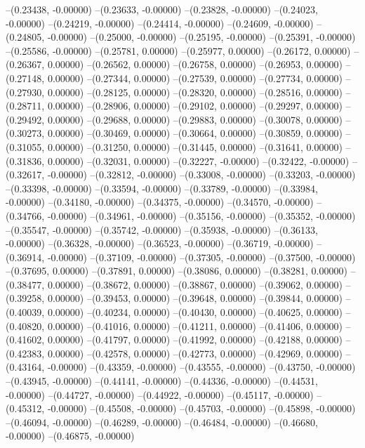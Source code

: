 --(0.23438, -0.00000)
--(0.23633, -0.00000)
--(0.23828, -0.00000)
--(0.24023, -0.00000)
--(0.24219, -0.00000)
--(0.24414, -0.00000)
--(0.24609, -0.00000)
--(0.24805, -0.00000)
--(0.25000, -0.00000)
--(0.25195, -0.00000)
--(0.25391, -0.00000)
--(0.25586, -0.00000)
--(0.25781, 0.00000)
--(0.25977, 0.00000)
--(0.26172, 0.00000)
--(0.26367, 0.00000)
--(0.26562, 0.00000)
--(0.26758, 0.00000)
--(0.26953, 0.00000)
--(0.27148, 0.00000)
--(0.27344, 0.00000)
--(0.27539, 0.00000)
--(0.27734, 0.00000)
--(0.27930, 0.00000)
--(0.28125, 0.00000)
--(0.28320, 0.00000)
--(0.28516, 0.00000)
--(0.28711, 0.00000)
--(0.28906, 0.00000)
--(0.29102, 0.00000)
--(0.29297, 0.00000)
--(0.29492, 0.00000)
--(0.29688, 0.00000)
--(0.29883, 0.00000)
--(0.30078, 0.00000)
--(0.30273, 0.00000)
--(0.30469, 0.00000)
--(0.30664, 0.00000)
--(0.30859, 0.00000)
--(0.31055, 0.00000)
--(0.31250, 0.00000)
--(0.31445, 0.00000)
--(0.31641, 0.00000)
--(0.31836, 0.00000)
--(0.32031, 0.00000)
--(0.32227, -0.00000)
--(0.32422, -0.00000)
--(0.32617, -0.00000)
--(0.32812, -0.00000)
--(0.33008, -0.00000)
--(0.33203, -0.00000)
--(0.33398, -0.00000)
--(0.33594, -0.00000)
--(0.33789, -0.00000)
--(0.33984, -0.00000)
--(0.34180, -0.00000)
--(0.34375, -0.00000)
--(0.34570, -0.00000)
--(0.34766, -0.00000)
--(0.34961, -0.00000)
--(0.35156, -0.00000)
--(0.35352, -0.00000)
--(0.35547, -0.00000)
--(0.35742, -0.00000)
--(0.35938, -0.00000)
--(0.36133, -0.00000)
--(0.36328, -0.00000)
--(0.36523, -0.00000)
--(0.36719, -0.00000)
--(0.36914, -0.00000)
--(0.37109, -0.00000)
--(0.37305, -0.00000)
--(0.37500, -0.00000)
--(0.37695, 0.00000)
--(0.37891, 0.00000)
--(0.38086, 0.00000)
--(0.38281, 0.00000)
--(0.38477, 0.00000)
--(0.38672, 0.00000)
--(0.38867, 0.00000)
--(0.39062, 0.00000)
--(0.39258, 0.00000)
--(0.39453, 0.00000)
--(0.39648, 0.00000)
--(0.39844, 0.00000)
--(0.40039, 0.00000)
--(0.40234, 0.00000)
--(0.40430, 0.00000)
--(0.40625, 0.00000)
--(0.40820, 0.00000)
--(0.41016, 0.00000)
--(0.41211, 0.00000)
--(0.41406, 0.00000)
--(0.41602, 0.00000)
--(0.41797, 0.00000)
--(0.41992, 0.00000)
--(0.42188, 0.00000)
--(0.42383, 0.00000)
--(0.42578, 0.00000)
--(0.42773, 0.00000)
--(0.42969, 0.00000)
--(0.43164, -0.00000)
--(0.43359, -0.00000)
--(0.43555, -0.00000)
--(0.43750, -0.00000)
--(0.43945, -0.00000)
--(0.44141, -0.00000)
--(0.44336, -0.00000)
--(0.44531, -0.00000)
--(0.44727, -0.00000)
--(0.44922, -0.00000)
--(0.45117, -0.00000)
--(0.45312, -0.00000)
--(0.45508, -0.00000)
--(0.45703, -0.00000)
--(0.45898, -0.00000)
--(0.46094, -0.00000)
--(0.46289, -0.00000)
--(0.46484, -0.00000)
--(0.46680, -0.00000)
--(0.46875, -0.00000)
